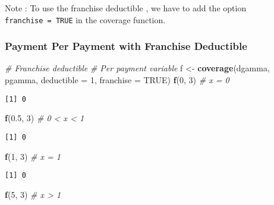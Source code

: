 \documentclass[]{book}
\newenvironment{Shaded}{\begin{snugshade}}{\end{snugshade}}
\newcommand{\KeywordTok}[1]{\textcolor[rgb]{0.13,0.29,0.53}{\textbf{#1}}}
\newcommand{\DataTypeTok}[1]{\textcolor[rgb]{0.13,0.29,0.53}{#1}}
\newcommand{\DecValTok}[1]{\textcolor[rgb]{0.00,0.00,0.81}{#1}}
\newcommand{\FloatTok}[1]{\textcolor[rgb]{0.00,0.00,0.81}{#1}}
\newcommand{\StringTok}[1]{\textcolor[rgb]{0.31,0.60,0.02}{#1}}
\newcommand{\CommentTok}[1]{\textcolor[rgb]{0.56,0.35,0.01}{\textit{#1}}}
\newcommand{\OtherTok}[1]{\textcolor[rgb]{0.56,0.35,0.01}{#1}}
\newcommand{\NormalTok}[1]{#1}
\theoremstyle{definition}
\theoremstyle{definition}
\theoremstyle{definition}
\theoremstyle{remark}
\begin{document}
Note : To use the franchise deductible , we have to add the option
\texttt{franchise\ =\ TRUE} in the coverage function.

\subsubsection{Payment Per Payment with Franchise
Deductible}\label{payment-per-payment-with-franchise-deductible}

\begin{Shaded}
\begin{Highlighting}[]
\CommentTok{# Franchise deductible}
\CommentTok{# Per payment variable}
\NormalTok{f <-}\StringTok{ }\KeywordTok{coverage}\NormalTok{(dgamma, pgamma, }\DataTypeTok{deductible =} \DecValTok{1}\NormalTok{, }\DataTypeTok{franchise =} \OtherTok{TRUE}\NormalTok{)}
\KeywordTok{f}\NormalTok{(}\DecValTok{0}\NormalTok{, }\DecValTok{3}\NormalTok{)  }\CommentTok{# x = 0}
\end{Highlighting}
\end{Shaded}

\begin{verbatim}
[1] 0
\end{verbatim}

\begin{Shaded}
\begin{Highlighting}[]
\KeywordTok{f}\NormalTok{(}\FloatTok{0.5}\NormalTok{, }\DecValTok{3}\NormalTok{)  }\CommentTok{# 0 < x < 1}
\end{Highlighting}
\end{Shaded}

\begin{verbatim}
[1] 0
\end{verbatim}

\begin{Shaded}
\begin{Highlighting}[]
\KeywordTok{f}\NormalTok{(}\DecValTok{1}\NormalTok{, }\DecValTok{3}\NormalTok{)  }\CommentTok{# x = 1}
\end{Highlighting}
\end{Shaded}

\begin{verbatim}
[1] 0
\end{verbatim}

\begin{Shaded}
\begin{Highlighting}[]
\KeywordTok{f}\NormalTok{(}\DecValTok{5}\NormalTok{, }\DecValTok{3}\NormalTok{)  }\CommentTok{# x > 1}
\end{Highlighting}
\end{Shaded}
\end{document}
